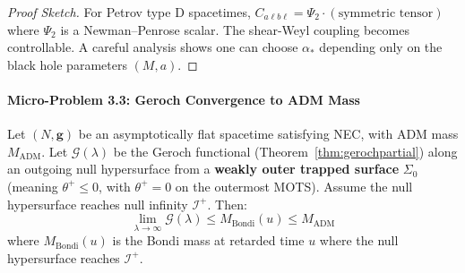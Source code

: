 \begin{proof}[Proof Sketch]
For Petrov type D spacetimes, $C_{a\ell b\ell} = \Psi_2 \cdot (\text{symmetric tensor})$ where $\Psi_2$ is a Newman--Penrose scalar. The shear-Weyl coupling becomes controllable. A careful analysis shows one can choose $\alpha_*$ depending only on the black hole parameters $(M, a)$.
\end{proof}

\paragraph{Micro-Problem 3.3: Geroch Convergence to ADM Mass}

\begin{theorem}\label{thm:gerochconv}
Let $(N, \mathbf{g})$ be an asymptotically flat spacetime satisfying NEC, with ADM mass $M_{\mathrm{ADM}}$. Let $\mathcal{G}(\lambda)$ be the Geroch functional (Theorem~\ref{thm:gerochpartial}) along an outgoing null hypersurface from a \textbf{weakly outer trapped surface} $\Sigma_0$ (meaning $\theta^+ \leq 0$, with $\theta^+ = 0$ on the outermost MOTS). Assume the null hypersurface reaches null infinity $\mathscr{I}^+$. Then:
\begin{equation}
    \lim_{\lambda \to \infty} \mathcal{G}(\lambda) \leq M_{\mathrm{Bondi}}(u) \leq M_{\mathrm{ADM}}
\end{equation}
where $M_{\mathrm{Bondi}}(u)$ is the Bondi mass at retarded time $u$ where the null hypersurface reaches $\mathscr{I}^+$.
\end{theorem}

